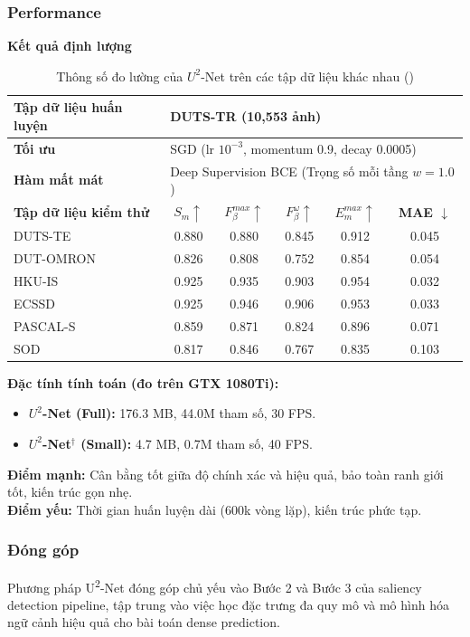 \subsubsection{Performance}
\textbf{Kết quả định lượng}
\begin{table}[H]
\centering
\caption{Thông số đo lường của $U^2$-Net trên các tập dữ liệu khác nhau (\cite{u2net_2020})}
\begin{tabular}{|l|c|c|c|c|c|}
\hline
\textbf{Tập dữ liệu huấn luyện} & \multicolumn{5}{l|}{DUTS-TR (10,553 ảnh)} \\ \hline
\textbf{Tối ưu} & \multicolumn{5}{l|}{SGD (lr $10^{-3}$, momentum 0.9, decay 0.0005)} \\ \hline
\textbf{Hàm mất mát} & \multicolumn{5}{l|}{Deep Supervision BCE (Trọng số mỗi tầng $w=1.0$)} \\ \hline
\hline
\textbf{Tập dữ liệu kiểm thử} & \textbf{$S_m \uparrow$} & \textbf{$F_{\beta}^{max} \uparrow$} & \textbf{$F_{\beta}^{\omega} \uparrow$} & \textbf{$E_m^{max} \uparrow$} & \textbf{MAE $\downarrow$} \\ \hline
DUTS-TE & 0.880 & 0.880 & 0.845 & 0.912 & 0.045 \\ \hline
DUT-OMRON & 0.826 & 0.808 & 0.752 & 0.854 & 0.054 \\ \hline
HKU-IS & 0.925 & 0.935 & 0.903 & 0.954 & 0.032 \\ \hline
ECSSD & 0.925 & 0.946 & 0.906 & 0.953 & 0.033 \\ \hline
PASCAL-S & 0.859 & 0.871 & 0.824 & 0.896 & 0.071 \\ \hline
SOD & 0.817 & 0.846 & 0.767 & 0.835 & 0.103 \\ \hline
\end{tabular}
\end{table}

\noindent \textbf{Đặc tính tính toán (đo trên GTX 1080Ti):} 
\begin{itemize}
    \item \textbf{$U^2$-Net (Full):} 176.3 MB, 44.0M tham số, 30 FPS.
    \item \textbf{$U^2$-Net$^\dagger$ (Small):} 4.7 MB, 0.7M tham số, 40 FPS.\\
\end{itemize}
\textbf{Điểm mạnh:} Cân bằng tốt giữa độ chính xác và hiệu quả, bảo toàn ranh giới tốt, kiến trúc gọn nhẹ.\\
\textbf{Điểm yếu:} Thời gian huấn luyện dài (600k vòng lặp), kiến trúc phức tạp.

\subsubsection{Đóng góp}
Phương pháp U\textsuperscript{2}-Net đóng góp chủ yếu vào Bước 2 và Bước 3 của saliency detection pipeline, tập trung vào việc học đặc trưng đa quy mô và mô hình hóa ngữ cảnh hiệu quả cho bài toán dense prediction.

